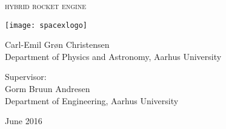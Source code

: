 
\begin{titlingpage}

\begin{center}

\vspace*{0cm}
\huge
\textsc{hybrid rocket engine}\\
\vspace{1.5cm}

\vspace{3cm}
\texttt{[image: spacexlogo]}
\vspace{4cm}

\large
{
    Carl-Emil Grøn Christensen\\
    Department of Physics and Astronomy, Aarhus University
}

\vspace{1.5cm}

{
  Supervisor:\\
  Gorm Bruun Andresen\\
  Department of Engineering, Aarhus University
}

\vspace{1.5cm}
{June 2016}\\


\end{center}



\end{titlingpage}
